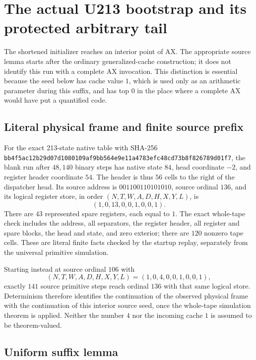 \section{The actual U213 bootstrap and its protected arbitrary tail}
\label{sec:u213-bootstrap}

The shortened initializer reaches an interior point of AX.  The appropriate
source lemma starts after the ordinary generalized-cache construction; it
does not identify this run with a complete AX invocation.  This distinction
is essential because the seed below has cache value $1$, which is used only
as an arithmetic parameter during this suffix, and has top $0$ in the place
where a complete AX would have put a quantified code.

\subsection{Literal physical frame and finite source prefix}

For the exact 213-state native table with SHA-256
\nolinkurl{bb4f5ac12b29d07d1080109af9bb564e9e11a4783efc48cd73b8f826789d01f7},
the blank run after $48{,}140$ binary steps
has native state $84$, head coordinate $-2$, and register header coordinate
$54$.  The header is thus $56$ cells to the right of the dispatcher head.
Its source address is $001100110101010$, source ordinal $136$, and its
logical register store, in order $(N,T,W,A,D,H,X,Y,L)$, is
\[
 (1,0,13,0,0,1,0,0,1).
\]
There are $43$ represented spare registers, each equal to $1$.  The exact
whole-tape check includes the address, all separators, the register header,
all register and spare blocks, the head and state, and zero exterior; there
are $120$ nonzero tape cells.  These are literal finite facts checked by
the startup replay, separately from the universal primitive simulation.

Starting instead at source ordinal $106$ with
\begin{equation}
 (N,T,W,A,D,H,X,Y,L)=(1,0,4,0,0,1,0,0,1),
 \label{eq:u213-synthetic-seed}
\end{equation}
exactly $141$ source primitive steps reach ordinal $136$ with that same
logical store.  Determinism therefore identifies the continuation of the
observed physical frame with the continuation of this interior source
seed, once the whole-tape simulation theorem is applied.  Neither the
number $4$ nor the incoming cache $1$ is assumed to be theorem-valued.

\subsection{Uniform suffix lemma}

